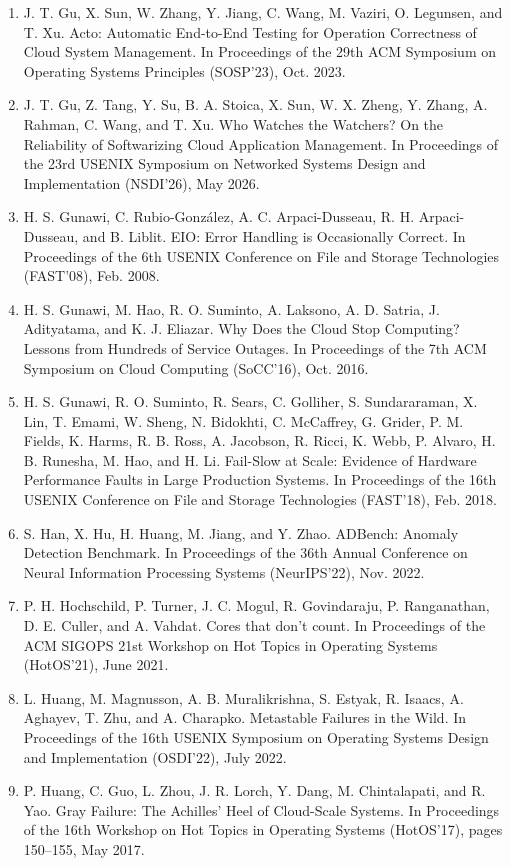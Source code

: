 \documentclass[11pt,UTF8,fontset=fandol]{ctexart}
\begin{document}
\begin{enumerate}[leftmargin=2.2em,labelsep=0.4em,itemsep=0.15em]
\item J. T. Gu, X. Sun, W. Zhang, Y. Jiang, C. Wang, M. Vaziri, O. Legunsen, and T. Xu. Acto: Automatic End-to-End Testing for Operation Correctness of Cloud System Management. In Proceedings of the 29th ACM Symposium on Operating Systems Principles (SOSP'23), Oct. 2023.
\item J. T. Gu, Z. Tang, Y. Su, B. A. Stoica, X. Sun, W. X. Zheng, Y. Zhang, A. Rahman, C. Wang, and T. Xu. Who Watches the Watchers? On the Reliability of Softwarizing Cloud Application Management. In Proceedings of the 23rd USENIX Symposium on Networked Systems Design and Implementation (NSDI'26), May 2026.
\item H. S. Gunawi, C. Rubio-González, A. C. Arpaci-Dusseau, R. H. Arpaci-Dusseau, and B. Liblit. EIO: Error Handling is Occasionally Correct. In Proceedings of the 6th USENIX Conference on File and Storage Technologies (FAST'08), Feb. 2008.
\item H. S. Gunawi, M. Hao, R. O. Suminto, A. Laksono, A. D. Satria, J. Adityatama, and K. J. Eliazar. Why Does the Cloud Stop Computing? Lessons from Hundreds of Service Outages. In Proceedings of the 7th ACM Symposium on Cloud Computing (SoCC'16), Oct. 2016.
\item H. S. Gunawi, R. O. Suminto, R. Sears, C. Golliher, S. Sundararaman, X. Lin, T. Emami, W. Sheng, N. Bidokhti, C. McCaffrey, G. Grider, P. M. Fields, K. Harms, R. B. Ross, A. Jacobson, R. Ricci, K. Webb, P. Alvaro, H. B. Runesha, M. Hao, and H. Li. Fail-Slow at Scale: Evidence of Hardware Performance Faults in Large Production Systems. In Proceedings of the 16th USENIX Conference on File and Storage Technologies (FAST'18), Feb. 2018.
\item S. Han, X. Hu, H. Huang, M. Jiang, and Y. Zhao. ADBench: Anomaly Detection Benchmark. In Proceedings of the 36th Annual Conference on Neural Information Processing Systems (NeurIPS'22), Nov. 2022.
\item P. H. Hochschild, P. Turner, J. C. Mogul, R. Govindaraju, P. Ranganathan, D. E. Culler, and A. Vahdat. Cores that don't count. In Proceedings of the ACM SIGOPS 21st Workshop on Hot Topics in Operating Systems (HotOS'21), June 2021.
\item L. Huang, M. Magnusson, A. B. Muralikrishna, S. Estyak, R. Isaacs, A. Aghayev, T. Zhu, and A. Charapko. Metastable Failures in the Wild. In Proceedings of the 16th USENIX Symposium on Operating Systems Design and Implementation (OSDI'22), July 2022.
\item P. Huang, C. Guo, L. Zhou, J. R. Lorch, Y. Dang, M. Chintalapati, and R. Yao. Gray Failure: The Achilles' Heel of Cloud-Scale Systems. In Proceedings of the 16th Workshop on Hot Topics in Operating Systems (HotOS'17), pages 150--155, May 2017.

\end{enumerate}
\end{document}
